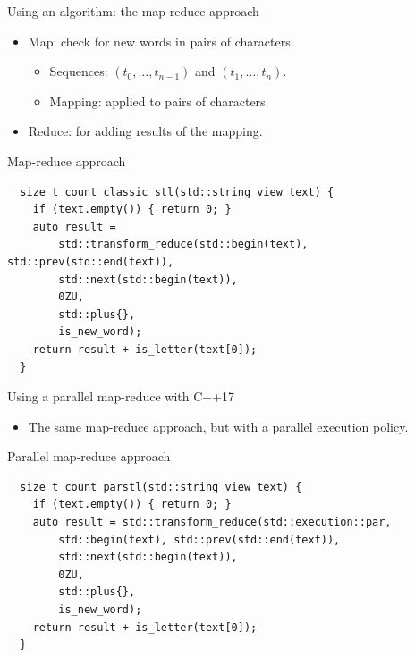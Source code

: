\begin{frame}[t,fragile]{Using an algorithm: the map-reduce approach}
    \begin{itemize}
        \item Map: check for new words in pairs of characters.
          \begin{itemize}
              \item Sequences: $(t_0, \ldots, t_{n-1})$ and $(t_1, \ldots, t_n)$.
              \item Mapping:  applied to pairs of characters.
          \end{itemize}
        \item Reduce:  for adding results of the mapping.
    \end{itemize}

\begin{block}{Map-reduce approach}
\begin{lstlisting}
  size_t count_classic_stl(std::string_view text) {
    if (text.empty()) { return 0; }
    auto result =
        std::transform_reduce(std::begin(text), std::prev(std::end(text)), 
        std::next(std::begin(text)), 
        0ZU,
        std::plus{}, 
        is_new_word);
    return result + is_letter(text[0]);
  }
\end{lstlisting}
\end{block}
\end{frame}

\begin{frame}[t,fragile]{Using a parallel map-reduce with C++17}
    \begin{itemize}
        \item The same map-reduce approach, but with a parallel execution policy.
    \end{itemize}

\begin{block}{Parallel map-reduce approach}
\begin{lstlisting}
  size_t count_parstl(std::string_view text) {
    if (text.empty()) { return 0; }
    auto result = std::transform_reduce(std::execution::par, 
        std::begin(text), std::prev(std::end(text)),
        std::next(std::begin(text)), 
        0ZU, 
        std::plus{},
        is_new_word);
    return result + is_letter(text[0]);
  }
\end{lstlisting}
\end{block}
\end{frame}

